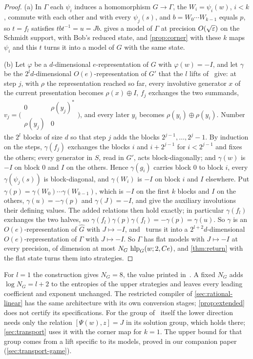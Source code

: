 \begin{proof}
(a) In $\Gamma$ each $\psi_i$ induces a homomorphism $G\to\Gamma$, the $W_i=\psi_i(w)$, $i<k$, commute with each other and with
every $\psi_j(s)$, and $b=W_0\cdots W_{k-1}$ equals $p$, so $t=f_l$ satisfies $tbt^{-1}=u=Jb$.  gives a model of
$\Gamma$ at precision $O(\sqrt{\varepsilon})$ on the Schmidt support, with Bob's reduced state, and \cref{prop:corner} with these $k$ maps
$\psi_i$ and this $t$ turns it into a model of $G$ with the same state.

(b) Let $\varphi$ be a $d$-dimensional $e$-representation of $G$ with $\varphi(w)=-I$, and let $\gamma$ be the
$2^ld$-dimensional $O(e)$-representation of $G'$ that the $l$ lifts of~\cite[proof of Proposition~4.8]{Slo19} give: at step
$j$, with $\rho$ the representation reached so far, every involutive generator $x$ of the current presentation becomes
$\rho(x)\oplus I$, $f_j$ exchanges the two summands,
$v_j=\bigl(\begin{smallmatrix}0&\rho(y_j)^*\\\rho(y_j)&0\end{smallmatrix}\bigr)$, and every later $y_i$ becomes $\rho(y_i)\oplus\rho(y_i)$.
Number the $2^l$ blocks of size $d$ so that step $j$ adds the blocks $2^{j-1},\dots,2^j-1$. By induction on the steps, $\gamma(f_j)$
exchanges the blocks $i$ and $i+2^{j-1}$ for $i<2^{j-1}$ and fixes the others; every generator in $S$, read in $G'$, acts
block-diagonally; and $\gamma(w)$ is $-I$ on block $0$ and $I$ on the others. Hence $\gamma(g_i)$ carries block $0$ to block $i$,
every $\gamma(\psi_j(s))$ is block-diagonal, and $\gamma(W_i)$ is $-I$ on block $i$ and $I$ elsewhere. Put
$\gamma(p)=\gamma(W_0)\cdots\gamma(W_{k-1})$, which is $-I$ on the first $k$ blocks and $I$ on the others, $\gamma(u)=-\gamma(p)$ and
$\gamma(J)=-I$, and give the auxiliary involutions their defining values. The added relations then hold exactly; in particular
$\gamma(f_l)$ exchanges the two halves, so $\gamma(f_l)\gamma(p)\gamma(f_l)=-\gamma(p)=\gamma(u)$. So $\gamma$ is an
$O(e)$-representation of $\widehat G$ with $J\mapsto-I$, and~\cite[Remark~4.5]{Slo19} turns it into a $2^{l+2}d$-dimensional
$O(e)$-representation of $\Gamma$ with $J\mapsto-I$. So $\Gamma$ has flat models with $J\mapsto-I$ at every precision, of dimension at
most $N_G\,\operatorname{hlp}_G(w;2,Ce)$, and \cref{thm:return} with the flat state turns them into strategies.
\end{proof}

For $l=1$ the construction gives $N_G=8$, the value printed in~\cite{SV18}. A fixed $N_G$ adds $\log N_G=l+2$ to the entropies of
the upper strategies and leaves every leading coefficient and exponent unchanged. The restricted compiler of \cref{sec:rational-linear}
has the same architecture with its own conversion stages; \cref{prop:extended} does not certify its specifications. For the group
of~\cite[Proposition~6.2]{SV18} itself the lower direction needs only the relation $[\Psi(w),z]=J$ in its solution group, which holds
there; \cref{sec:transport} uses it with the corner map for $k=1$. The upper bound for that group comes from a lift specific to its
models, proved in our companion paper~\cite[Lemma~11.13]{DM-game} (\cref{sec:transport-game}).
